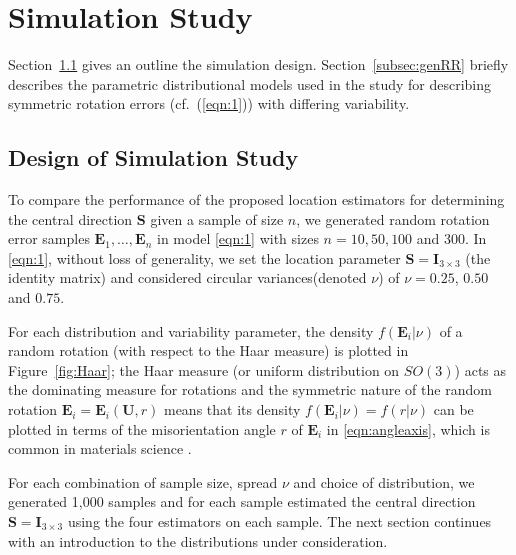 \section{Simulation Study}\label{ch:simulation}

Section~\ref{subsec:simdesign} gives an outline the simulation design.  Section~\ref{subsec:genRR} briefly describes the parametric distributional models used in the study for describing symmetric rotation errors (cf.~(\ref{eqn:1})) with differing variability. 


\subsection{Design of Simulation Study}
\label{subsec:simdesign}
To compare the performance of the proposed location estimators for determining the central direction $\bm{S}$ given a sample of size $n$, we generated random rotation error samples  $\bm E_1, \ldots, \bm E_n$  in model \eqref{eqn:1} with sizes $n=10, 50, 100$ and 300. In \eqref{eqn:1}, without loss of generality, we set the location parameter $\bm S=\bm I_{3\times 3}$ (the identity matrix) and considered circular variances(denoted $\nu$) of $\nu=0.25$, $0.50$ and $0.75$. 

For each distribution and variability parameter, the density $f(\bm E_i|\nu)$ of a random rotation (with respect to the Haar measure) is plotted in Figure~\ref{fig:Haar}; the Haar measure (or uniform distribution on $SO(3)$) acts as the dominating measure for rotations and the symmetric nature of the random rotation $\bm E_i=\bm E_i(\bm U,r)$ means that its density $f(\bm E_i|\nu)=f(r|\nu)$ can be plotted in terms of the misorientation angle $r$ of $\bm E_i$ in \eqref{eqn:angleaxis}, which is common in materials science \citep{matthies88, savyolova95}. 



For each combination of sample size, spread $\nu$ and choice of distribution, we generated 1,000 samples and for each sample estimated the central direction  $\bm S=\bm I_{3\times 3}$ using the four estimators on each sample.  The next section continues with an introduction to the distributions under consideration.


